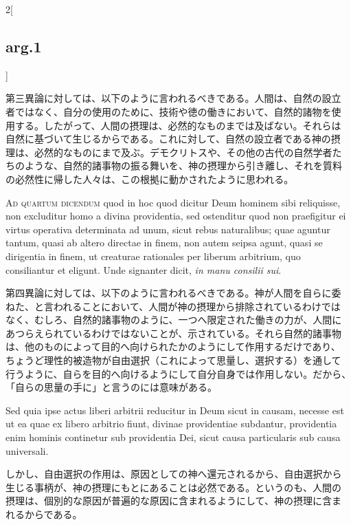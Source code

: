 \documentclass[paper=a4paper,fontsize=10pt,jafontsize=9pt,titlepage]{jlreq}
\begin{document}
\begin{paracol}{2}[\subsection{arg.1}]
\switchcolumn

第三異論に対しては、以下のように言われるべきである。人間は、自然の設立
者ではなく、自分の使用のために、技術や徳の働きにおいて、自然的諸物を使
用する。したがって、人間の摂理は、必然的なものまでは及ばない。それらは
自然に基づいて生じるからである。これに対して、自然の設立者である神の摂
理は、必然的なものにまで及ぶ。デモクリトスや、その他の古代の自然学者た
ちのような、自然的諸事物の振る舞いを、神の摂理から引き離し、それを質料
の必然性に帰した人々は、この根拠に動かされたように思われる。

\switchcolumn*[\subsection{ad.4}]

{\scshape Ad quartum dicendum} quod in hoc quod dicitur
Deum hominem sibi reliquisse, non excluditur homo a divina providentia,
sed ostenditur quod non praefigitur ei virtus operativa determinata ad
unum, sicut rebus naturalibus; quae aguntur tantum, quasi ab altero
directae in finem, non autem seipsa agunt, quasi se dirigentia in finem,
ut creaturae rationales per liberum arbitrium, quo consiliantur et
eligunt. Unde signanter dicit, {\itshape in manu consilii sui}.

\switchcolumn

第四異論に対しては、以下のように言われるべきである。神が人間を自らに委
ねた、と言われることにおいて、人間が神の摂理から排除されているわけでは
なく、むしろ、自然的諸事物のように、一つへ限定された働きの力が、人間に
あつらえられているわけではないことが、示されている。それら自然的諸事物
は、他のものによって目的へ向けられたかのようにして作用するだけであり、
ちょうど理性的被造物が自由選択（これによって思量し、選択する）を通して
行うように、自らを目的へ向けるようにして自分自身では作用しない。だから、
「自らの思量の手に」と言うのには意味がある。

\switchcolumn*

Sed quia ipse actus
liberi arbitrii reducitur in Deum sicut in causam, necesse est ut ea
quae ex libero arbitrio fiunt, divinae providentiae subdantur,
providentia enim hominis continetur sub providentia Dei, sicut causa
particularis sub causa universali.

\switchcolumn

しかし、自由選択の作用は、原因としての神へ還元されるから、自由選択から
生じる事柄が、神の摂理にもとにあることは必然である。というのも、人間の
摂理は、個別的な原因が普遍的な原因に含まれるようにして、神の摂理に含ま
れるからである。


\end{paracol}
\end{document}
